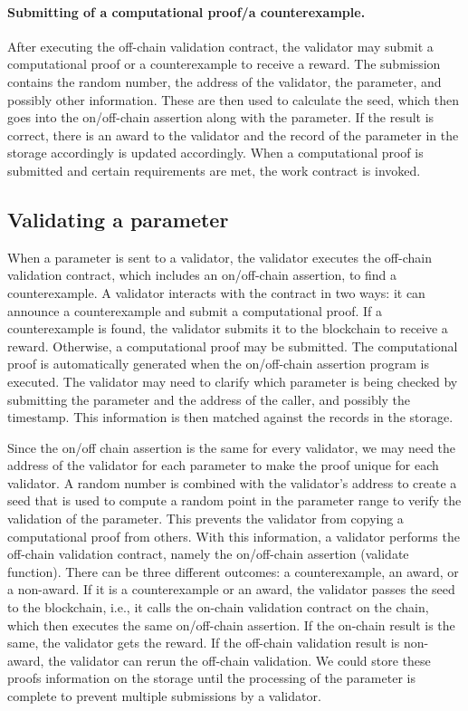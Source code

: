 \documentclass[runningheads]{llncs}
\begin{document}
\paragraph{Submitting of a computational proof/a counterexample.} After executing the off-chain validation contract, the validator may submit a computational proof or a counterexample to receive a reward. The submission contains the random number, the address of the validator, the parameter, and possibly other information. These are then used to calculate the seed, which then goes into the on/off-chain assertion along with the parameter. If the result is correct, there is an award to the validator and the record of the parameter in the storage accordingly is updated accordingly. When a computational proof is submitted and  certain requirements are met, the work contract is invoked. 

\subsection{Validating a parameter}
When a parameter is sent to a validator, the validator executes the off-chain validation contract, which includes an on/off-chain assertion, to find a counterexample. A validator interacts with the contract in two ways: it can announce a counterexample and submit a computational proof. If a counterexample is found, the validator submits it to the blockchain to receive a reward. Otherwise, a computational proof may be submitted. The computational proof is automatically generated when the on/off-chain assertion program is executed. The validator may need to clarify which parameter is being checked by submitting the parameter and the address of the caller, and possibly the timestamp. This information is then matched against the records in the storage. 

Since the on/off chain assertion is the same for every validator, we may need the address of the validator for each parameter to make the proof unique for each validator. A random number is combined with the validator's address to create a seed that is used to compute a random point in the parameter range to verify the validation of the parameter. This prevents the validator from copying a computational proof from others. With this information, a validator performs the off-chain validation contract, namely the on/off-chain assertion (validate function). There can be three different outcomes: a counterexample, an award, or a non-award. If it is a counterexample or an award, the validator passes the seed to the blockchain, i.e., it calls the on-chain validation contract on the chain, which then executes the same on/off-chain assertion. If the on-chain result is the same, the validator gets the reward. If the off-chain validation result is  non-award, the validator can rerun the off-chain validation. We could store these proofs information on the storage until the processing of the parameter is complete to prevent multiple submissions by a validator. 
\end{document}

